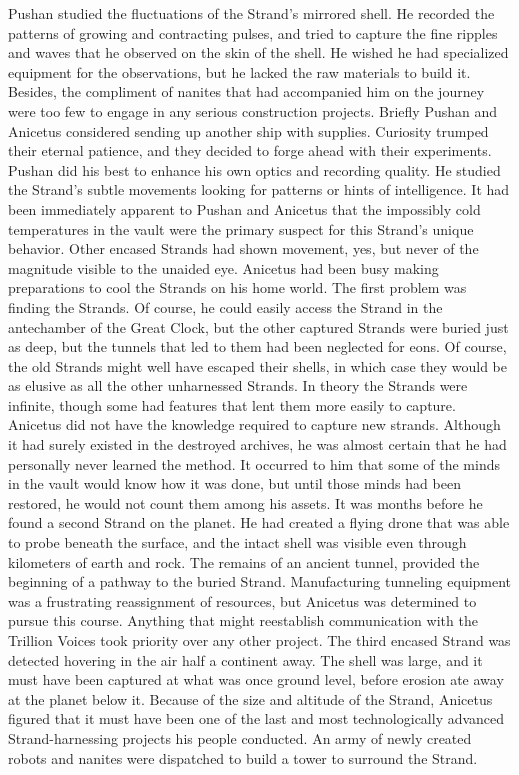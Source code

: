\documentclass[a4paper]{article}
\begin{document}
Pushan studied the fluctuations of the Strand’s mirrored shell. He recorded the patterns of growing and contracting pulses, and tried to capture the fine ripples and waves that he observed on the skin of the shell. He wished he had specialized equipment for the observations, but he lacked the raw materials to build it. Besides, the compliment of nanites that had accompanied him on the journey were too few to engage in any serious construction projects.
Briefly Pushan and Anicetus considered sending up another ship with supplies. Curiosity trumped their eternal patience, and they decided to forge ahead with their experiments. Pushan did his best to enhance his own optics and recording quality. He studied the Strand’s subtle movements looking for patterns or hints of intelligence.
It had been immediately apparent to Pushan and Anicetus that the impossibly cold temperatures in the vault were the primary suspect for this Strand’s unique behavior. Other encased Strands had shown movement, yes, but never of the magnitude visible to the unaided eye.
Anicetus had been busy making preparations to cool the Strands on his home world. The first problem was finding the Strands. Of course, he could easily access the Strand in the antechamber of the Great Clock, but the other captured Strands were buried just as deep, but the tunnels that led to them had been neglected for eons.
Of course, the old Strands might well have escaped their shells, in which case they would be as elusive as all the other unharnessed Strands. In theory the Strands were infinite, though some had features that lent them more easily to capture. Anicetus did not have the knowledge required to capture new strands. Although it had surely existed in the destroyed archives, he was almost certain that he had personally never learned the method. It occurred to him that some of the minds in the vault would know how it was done, but until those minds had been restored, he would not count them among his assets.
It was months before he found a second Strand on the planet. He had created a flying drone that was able to probe beneath the surface, and the intact shell was visible even through kilometers of earth and rock. The remains of an ancient tunnel, provided the beginning of a pathway to the buried Strand. Manufacturing tunneling equipment was a frustrating reassignment of resources, but Anicetus was determined to pursue this course. Anything that might reestablish communication with the Trillion Voices took priority over any other project.
The third encased Strand was detected hovering in the air half a continent away. The shell was large, and it must have been captured at what was once ground level, before erosion ate away at the planet below it. Because of the size and altitude of the Strand, Anicetus figured that it must have been one of the last and most technologically advanced Strand-harnessing projects his people conducted. An army of newly created robots and nanites were dispatched to build a tower to surround the Strand.
\end{document}

